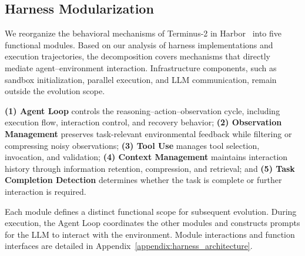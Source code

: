 \documentclass{article} %
\begin{document}






\subsection{Harness Modularization}
\label{sec:harness_modularization}

We reorganize the behavioral mechanisms of Terminus-2 in Harbor~\citep{merrill2026terminalbenchbenchmarkingagentshard} into five functional modules.
Based on our analysis of harness implementations and execution trajectories, the decomposition covers mechanisms that directly mediate agent--environment interaction.
Infrastructure components, such as sandbox initialization, parallel execution, and LLM communication, remain outside the evolution scope.

\textbf{(1) Agent Loop} controls the reasoning--action--observation cycle, including execution flow, interaction control, and recovery behavior;
\textbf{(2) Observation Management} preserves task-relevant environmental feedback while filtering or compressing noisy observations;
\textbf{(3) Tool Use} manages tool selection, invocation, and validation;
\textbf{(4) Context Management} maintains interaction history through information retention, compression, and retrieval; and
\textbf{(5) Task Completion Detection} determines whether the task is complete or further interaction is required.

Each module defines a distinct functional scope for subsequent evolution.
During execution, the Agent Loop coordinates the other modules and constructs prompts for the LLM to interact with the environment.
Module interactions and function interfaces are detailed in Appendix~\ref{appendix:harness_architecture}.
\end{document}
